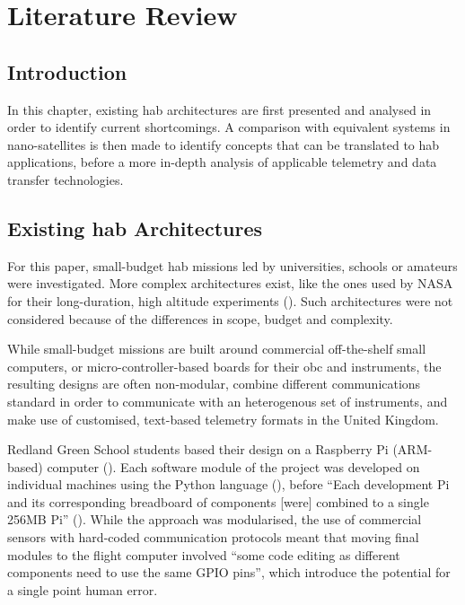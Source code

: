 \chapter{Literature Review}
\label{ch:literature-review}

\section{Introduction}

In this chapter, existing \acrlong{hab} architectures are first presented and analysed in order to identify current shortcomings. A comparison with equivalent systems in nano-satellites is then made to identify concepts that can be translated to \acrshort{hab} applications, before a more in-depth analysis of applicable telemetry and data transfer technologies.

\section{Existing \acrlong{hab} Architectures}

For this paper, small-budget \acrlong{hab} missions led by universities, schools or amateurs were investigated. More complex architectures exist, like the ones used by NASA for their long-duration, high altitude experiments (\cite{Eggers2016}). Such architectures were not considered because of the differences in scope, budget and complexity.

While small-budget missions are built around commercial off-the-shelf small computers, or micro-controller-based boards for their \acrlong{obc} and instruments, the resulting designs are often non-modular, combine different communications standard in order to communicate with an heterogenous set of instruments, and make use of customised, text-based telemetry formats in the United Kingdom.

Redland Green School students based their design on a Raspberry Pi (ARM-based) computer (\cite{rpi2014}). Each software module of the project was developed on individual machines using the Python language (\cite{VanRossum2011}), before ``Each development Pi and its corresponding breadboard of components [were] combined to a single 256MB Pi'' (\cite{Hinschelwood2015}). While the approach was modularised, the use of commercial sensors with hard-coded communication protocols meant that moving final modules to the flight computer involved ``some code editing as different components need to use the same GPIO pins'', which introduce the potential for a single point human error.

